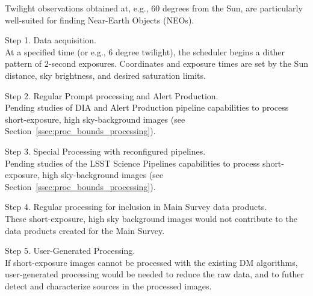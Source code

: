 Twilight observations obtained at, e.g., 60 degrees from the Sun, are particularly
well-suited for finding Near-Earth Objects (NEOs).

Step 1. Data acquisition. \\
At a specified time (or e.g., 6 degree twilight), the scheduler begins a dither pattern of 
$2$-second exposures. 
Coordinates and exposure times are set by the Sun distance, sky brightness, and desired saturation limits.

Step 2. Regular Prompt processing and Alert Production. \\
Pending studies of DIA and Alert Production pipeline capabilities to process 
short-exposure, high sky-background images (see Section~\ref{ssec:proc_bounds_processing}).

Step 3. Special Processing with reconfigured pipelines. \\
Pending studies of the LSST Science Pipelines capabilities to process 
short-exposure, high sky-background images (see Section~\ref{ssec:proc_bounds_processing}).

Step 4. Regular processing for inclusion in Main Survey data products. \\
These short-exposure, high sky background images would not contribute to the data products created for the Main Survey.

Step 5. User-Generated Processing. \\
If short-exposure images cannot be processed with the existing DM algorithms, 
user-generated processing would be needed to reduce the raw data, and to 
futher detect and characterize sources in the processed images.




